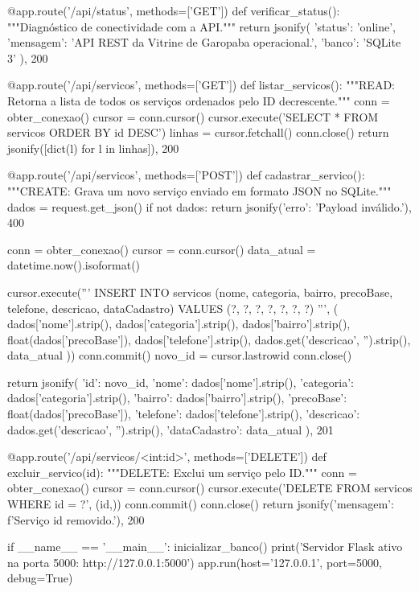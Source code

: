 \begin{boxCodigoPY}
@app.route('/api/status', methods=['GET'])
def verificar_status():
    """Diagnóstico de conectividade com a API."""
    return jsonify({
        'status': 'online',
        'mensagem': 'API REST da Vitrine de Garopaba operacional.',
        'banco': 'SQLite 3'
    }), 200

@app.route('/api/servicos', methods=['GET'])
def listar_servicos():
    """READ: Retorna a lista de todos os serviços ordenados pelo ID decrescente."""
    conn = obter_conexao()
    cursor = conn.cursor()
    cursor.execute('SELECT * FROM servicos ORDER BY id DESC')
    linhas = cursor.fetchall()
    conn.close()
    return jsonify([dict(l) for l in linhas]), 200

@app.route('/api/servicos', methods=['POST'])
def cadastrar_servico():
    """CREATE: Grava um novo serviço enviado em formato JSON no SQLite."""
    dados = request.get_json()
    if not dados:
        return jsonify({'erro': 'Payload inválido.'}), 400

    conn = obter_conexao()
    cursor = conn.cursor()
    data_atual = datetime.now().isoformat()

    cursor.execute('''
        INSERT INTO servicos (nome, categoria, bairro, precoBase, telefone, descricao, dataCadastro)
        VALUES (?, ?, ?, ?, ?, ?, ?)
    ''', (
        dados['nome'].strip(),
        dados['categoria'].strip(),
        dados['bairro'].strip(),
        float(dados['precoBase']),
        dados['telefone'].strip(),
        dados.get('descricao', '').strip(),
        data_atual
    ))
    conn.commit()
    novo_id = cursor.lastrowid
    conn.close()

    return jsonify({
        'id': novo_id,
        'nome': dados['nome'].strip(),
        'categoria': dados['categoria'].strip(),
        'bairro': dados['bairro'].strip(),
        'precoBase': float(dados['precoBase']),
        'telefone': dados['telefone'].strip(),
        'descricao': dados.get('descricao', '').strip(),
        'dataCadastro': data_atual
    }), 201

@app.route('/api/servicos/<int:id>', methods=['DELETE'])
def excluir_servico(id):
    """DELETE: Exclui um serviço pelo ID."""
    conn = obter_conexao()
    cursor = conn.cursor()
    cursor.execute('DELETE FROM servicos WHERE id = ?', (id,))
    conn.commit()
    conn.close()
    return jsonify({'mensagem': f'Serviço {id} removido.'}), 200

if __name__ == '__main__':
    inicializar_banco()
    print('Servidor Flask ativo na porta 5000: http://127.0.0.1:5000')
    app.run(host='127.0.0.1', port=5000, debug=True)
\end{boxCodigoPY}

